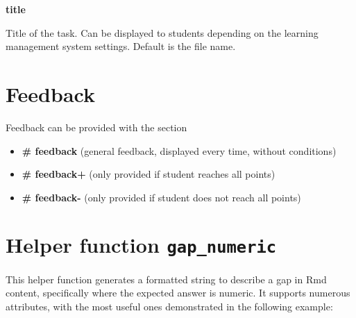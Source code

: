 \documentclass[twoside]{tufte-book}
\providecommand{\tightlist}{%
  \setlength{\itemsep}{0pt}\setlength{\parskip}{0pt}}
\begin{document}
\noindent\textbf{title}\label{title-2}

Title of the task. Can be displayed to students depending on
the learning management system settings. Default is the file name.

\section{Feedback}\label{feedback-2}

Feedback can be provided with the section

\begin{itemize}
\tightlist
\item
  \textbf{\# feedback} (general feedback, displayed every time, without conditions)
\item
  \textbf{\# feedback+} (only provided if student reaches all points)
\item
  \textbf{\# feedback-} (only provided if student does not reach all points)
\end{itemize}

\section{\texorpdfstring{Helper function \texttt{gap\_numeric}}{Helper function gap\_numeric}}\label{gapnumeric}

This helper function generates a formatted string to describe a gap in Rmd content, specifically where the expected answer is numeric. It supports numerous attributes, with the most useful ones demonstrated in the following example:
\end{document}
